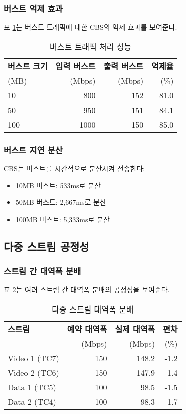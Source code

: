 \documentclass[twocolumn,10pt]{article}
\begin{document}
\subsubsection{버스트 억제 효과}

표 \ref{tab:burst_suppression}는 버스트 트래픽에 대한 CBS의 억제 효과를 보여준다.

\begin{table}[h]
\centering
\caption{버스트 트래픽 처리 성능}
\label{tab:burst_suppression}
\begin{tabular}{lrrr}
\toprule
\textbf{버스트 크기} & \textbf{입력 버스트} & \textbf{출력 버스트} & \textbf{억제율} \\
(MB) & (Mbps) & (Mbps) & (\%) \\
\midrule
10 & 800 & 152 & 81.0 \\
50 & 950 & 151 & 84.1 \\
100 & 1000 & 150 & 85.0 \\
\bottomrule
\end{tabular}
\end{table}

\subsubsection{버스트 지연 분산}

CBS는 버스트를 시간적으로 분산시켜 전송한다:

\begin{itemize}
    \item 10MB 버스트: 533ms로 분산
    \item 50MB 버스트: 2,667ms로 분산
    \item 100MB 버스트: 5,333ms로 분산
\end{itemize}

\subsection{다중 스트림 공정성}

\subsubsection{스트림 간 대역폭 분배}

표 \ref{tab:fairness}는 여러 스트림 간 대역폭 분배의 공정성을 보여준다.

\begin{table}[h]
\centering
\caption{다중 스트림 대역폭 분배}
\label{tab:fairness}
\begin{tabular}{lrrr}
\toprule
\textbf{스트림} & \textbf{예약 대역폭} & \textbf{실제 대역폭} & \textbf{편차} \\
 & (Mbps) & (Mbps) & (\%) \\
\midrule
Video 1 (TC7) & 150 & 148.2 & -1.2 \\
Video 2 (TC6) & 150 & 147.9 & -1.4 \\
Data 1 (TC5) & 100 & 98.5 & -1.5 \\
Data 2 (TC4) & 100 & 98.3 & -1.7 \\
\bottomrule
\end{tabular}
\end{table}
\end{document}
